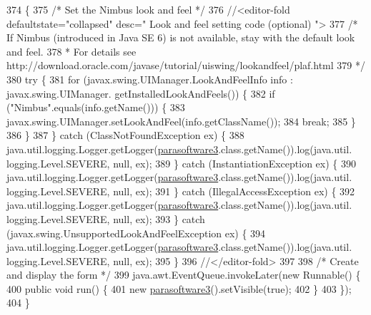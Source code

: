 \begin{DoxyCode}
374                                            \{
375         \textcolor{comment}{/* Set the Nimbus look and feel */}
376         \textcolor{comment}{//<editor-fold defaultstate="collapsed" desc=" Look and feel setting code (optional) ">}
377         \textcolor{comment}{/* If Nimbus (introduced in Java SE 6) is not available, stay with the default look and feel.}
378 \textcolor{comment}{         * For details see http://download.oracle.com/javase/tutorial/uiswing/lookandfeel/plaf.html }
379 \textcolor{comment}{         */}
380         \textcolor{keywordflow}{try} \{
381             \textcolor{keywordflow}{for} (javax.swing.UIManager.LookAndFeelInfo info : javax.swing.UIManager.
      getInstalledLookAndFeels()) \{
382                 \textcolor{keywordflow}{if} (\textcolor{stringliteral}{"Nimbus"}.equals(info.getName())) \{
383                     javax.swing.UIManager.setLookAndFeel(info.getClassName());
384                     \textcolor{keywordflow}{break};
385                 \}
386             \}
387         \} \textcolor{keywordflow}{catch} (ClassNotFoundException ex) \{
388             java.util.logging.Logger.getLogger(\mbox{\hyperlink{classsoftware_1_1parasoftware3_a385a29df3aa055a693bbb47225703547}{parasoftware3}}.class.getName()).log(java.util.
      logging.Level.SEVERE, null, ex);
389         \} \textcolor{keywordflow}{catch} (InstantiationException ex) \{
390             java.util.logging.Logger.getLogger(\mbox{\hyperlink{classsoftware_1_1parasoftware3_a385a29df3aa055a693bbb47225703547}{parasoftware3}}.class.getName()).log(java.util.
      logging.Level.SEVERE, null, ex);
391         \} \textcolor{keywordflow}{catch} (IllegalAccessException ex) \{
392             java.util.logging.Logger.getLogger(\mbox{\hyperlink{classsoftware_1_1parasoftware3_a385a29df3aa055a693bbb47225703547}{parasoftware3}}.class.getName()).log(java.util.
      logging.Level.SEVERE, null, ex);
393         \} \textcolor{keywordflow}{catch} (javax.swing.UnsupportedLookAndFeelException ex) \{
394             java.util.logging.Logger.getLogger(\mbox{\hyperlink{classsoftware_1_1parasoftware3_a385a29df3aa055a693bbb47225703547}{parasoftware3}}.class.getName()).log(java.util.
      logging.Level.SEVERE, null, ex);
395         \}
396         \textcolor{comment}{//</editor-fold>}
397 
398         \textcolor{comment}{/* Create and display the form */}
399         java.awt.EventQueue.invokeLater(\textcolor{keyword}{new} Runnable() \{
400             \textcolor{keyword}{public} \textcolor{keywordtype}{void} run() \{
401                 \textcolor{keyword}{new} \mbox{\hyperlink{classsoftware_1_1parasoftware3_a385a29df3aa055a693bbb47225703547}{parasoftware3}}().setVisible(\textcolor{keyword}{true});
402             \}
403         \});
404     \}
\end{DoxyCode}


